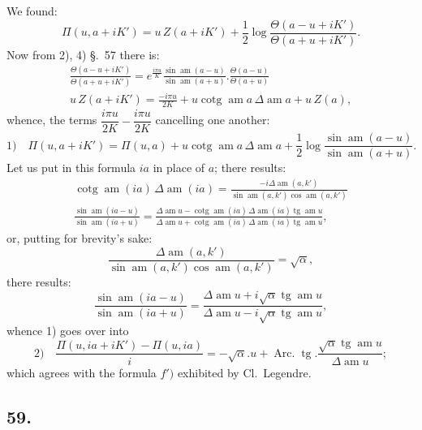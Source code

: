 \documentclass{article}
\begin{document}
We found:
\[
\Pi(u,a+iK')=u\,Z(a+iK')+\frac{1}{2}\log\frac{\Theta(a-u+iK')}{\Theta(a+u+iK')}.
\]
Now from 2), 4) §.\ 57 there is:
\[
\begin{gathered}
\frac{\Theta(a-u+iK')}{\Theta(a+u+iK')}=e^{\frac{i\pi u}{K}}\frac{\sin\operatorname{am}(a-u)}{\sin\operatorname{am}(a+u)}.\frac{\Theta(a-u)}{\Theta(a+u)}\\[1.5ex]
u\,Z(a+iK')=\frac{-i\pi u}{2K}+u\operatorname{cotg}\operatorname{am}a\,\Delta\operatorname{am}a+u\,Z(a),
\end{gathered}
\]
whence, the terms $\dfrac{i\pi u}{2K}-\dfrac{i\pi u}{2K}$ cancelling one another:
\[
\text{1)}\quad \Pi(u,a+iK')=\Pi(u,a)+u\operatorname{cotg}\operatorname{am}a\,\Delta\operatorname{am}a+\frac{1}{2}\log\frac{\sin\operatorname{am}(a-u)}{\sin\operatorname{am}(a+u)}.
\]
Let us put in this formula $ia$ in place of $a$; there results:
\[
\begin{gathered}
\operatorname{cotg}\operatorname{am}(ia)\,\Delta\operatorname{am}(ia)=\frac{-i\Delta\operatorname{am}(a,k')}{\sin\operatorname{am}(a,k')\cos\operatorname{am}(a,k')}\\[1.5ex]
\frac{\sin\operatorname{am}(ia-u)}{\sin\operatorname{am}(ia+u)}=\frac{\Delta\operatorname{am}u-\operatorname{cotg}\operatorname{am}(ia)\,\Delta\operatorname{am}(ia)\operatorname{tg}\operatorname{am}u}{\Delta\operatorname{am}u+\operatorname{cotg}\operatorname{am}(ia)\,\Delta\operatorname{am}(ia)\operatorname{tg}\operatorname{am}u},
\end{gathered}
\]
or, putting for brevity's sake:
\[
\frac{\Delta\operatorname{am}(a,k')}{\sin\operatorname{am}(a,k')\cos\operatorname{am}(a,k')}=\sqrt{\alpha},
\]
there results:
\[
\frac{\sin\operatorname{am}(ia-u)}{\sin\operatorname{am}(ia+u)}=\frac{\Delta\operatorname{am}u+i\sqrt{\alpha}\operatorname{tg}\operatorname{am}u}{\Delta\operatorname{am}u-i\sqrt{\alpha}\operatorname{tg}\operatorname{am}u},
\]
whence 1) goes over into
\[
\text{2)}\quad \frac{\Pi(u,ia+iK')-\Pi(u,ia)}{i}=-\sqrt{\alpha}.u+\operatorname{Arc.}\operatorname{tg}.\frac{\sqrt{\alpha}\operatorname{tg}\operatorname{am}u}{\Delta\operatorname{am}u};
\]
which agrees with the formula $f')$ exhibited by Cl.\ Legendre.

\subsection*{59.}
\end{document}
